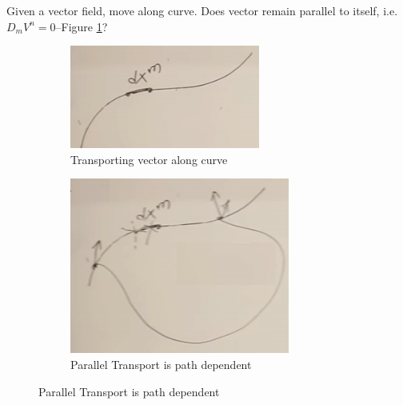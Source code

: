 \documentclass[]{article}
\begin{document}
{Given a vector field, move along curve. Does vector remain parallel to itself, i.e. $D_m V^n=0$--Figure \ref{fig:gr-4-DV-along-curve}?

\begin{figure}[H]
	\caption{Parallel Transport}
	\begin{center}
		\begin{subfigure}[t]{0.45\textwidth}
			\caption{Transporting vector along curve}\label{fig:gr-4-DV-along-curve}
			\includegraphics[width=\textwidth]{gr-4-DV-along-curve}
		\end{subfigure}
		\;
		\begin{subfigure}[t]{0.45\textwidth}
			\caption{Parallel Transport is path dependent}\label{fig:gr-4-parallel-transport-path-dependent}
			\includegraphics[width=\textwidth]{gr-4-parallel-transport-path-dependent}
		\end{subfigure}
	\end{center}
\end{figure}

}
\end{document}
